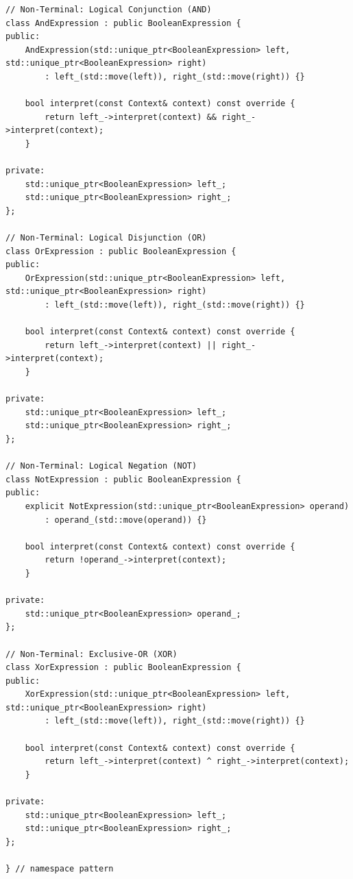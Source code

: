 \documentclass[12pt,a4paper]{article}
\begin{document}
\newpage
\begin{lstlisting}[caption={Non-Terminal Expressions: AND, OR, NOT, XOR with Unique Ownership}]
// Non-Terminal: Logical Conjunction (AND)
class AndExpression : public BooleanExpression {
public:
    AndExpression(std::unique_ptr<BooleanExpression> left, std::unique_ptr<BooleanExpression> right)
        : left_(std::move(left)), right_(std::move(right)) {}

    bool interpret(const Context& context) const override {
        return left_->interpret(context) && right_->interpret(context);
    }

private:
    std::unique_ptr<BooleanExpression> left_;
    std::unique_ptr<BooleanExpression> right_;
};

// Non-Terminal: Logical Disjunction (OR)
class OrExpression : public BooleanExpression {
public:
    OrExpression(std::unique_ptr<BooleanExpression> left, std::unique_ptr<BooleanExpression> right)
        : left_(std::move(left)), right_(std::move(right)) {}

    bool interpret(const Context& context) const override {
        return left_->interpret(context) || right_->interpret(context);
    }

private:
    std::unique_ptr<BooleanExpression> left_;
    std::unique_ptr<BooleanExpression> right_;
};

// Non-Terminal: Logical Negation (NOT)
class NotExpression : public BooleanExpression {
public:
    explicit NotExpression(std::unique_ptr<BooleanExpression> operand)
        : operand_(std::move(operand)) {}

    bool interpret(const Context& context) const override {
        return !operand_->interpret(context);
    }

private:
    std::unique_ptr<BooleanExpression> operand_;
};

// Non-Terminal: Exclusive-OR (XOR)
class XorExpression : public BooleanExpression {
public:
    XorExpression(std::unique_ptr<BooleanExpression> left, std::unique_ptr<BooleanExpression> right)
        : left_(std::move(left)), right_(std::move(right)) {}

    bool interpret(const Context& context) const override {
        return left_->interpret(context) ^ right_->interpret(context);
    }

private:
    std::unique_ptr<BooleanExpression> left_;
    std::unique_ptr<BooleanExpression> right_;
};

} // namespace pattern
\end{lstlisting}
\end{document}
